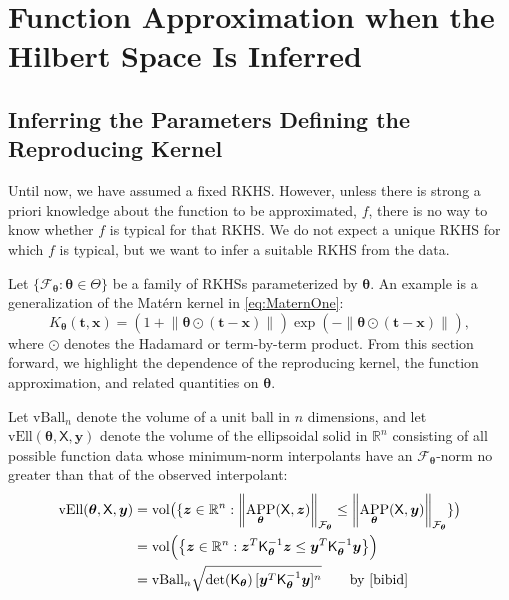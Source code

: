 \documentclass[]{mcom-l}
\theoremstyle{remark}
\newcommand{\vBall}{\text{vBall}_n}
\newcommand{\vEll}{\text{vEll}}
\DeclareMathOperator{\vol}{vol}
\DeclareMathOperator{\APP}{APP}
\newcommand{\reals}{{\mathbb{R}}}
\newcommand{\mK}{\mathsf{K}}
\newcommand{\mX}{\mathsf{X}}
\newcommand{\bx}{{\boldsymbol{x}}}
\newcommand{\by}{{\boldsymbol{y}}}
\newcommand{\bt}{{\boldsymbol{t}}}
\newcommand{\bz}{{\boldsymbol{z}}}
\newcommand{\btheta}{{\boldsymbol{\theta}}}
\newcommand{\calf}{{\mathcal{F}}}
\newcommand{\norm}[2][{}]{\ensuremath{\left \lVert #2 \right \rVert}_{#1}}
\begin{document}
\section{Function Approximation when the Hilbert Space Is Inferred} \label{sec:adaptF}



\subsection{Inferring the Parameters Defining the Reproducing Kernel} \label{sec:adaptTheta}

Until now, we have assumed a fixed RKHS.  However, unless there is strong a priori knowledge about the function to be approximated, $f$, there is no way to know whether $f$ is typical for  that RKHS.  We do not expect a unique RKHS for which $f$ is typical, but we want to infer a suitable RKHS from the data.  

Let $\{\calf_{\btheta} : \btheta \in \Theta\}$ be a family of RKHSs parameterized by $\btheta$.  An example is a generalization of the Mat\'ern kernel  in \eqref{eq:MaternOne}:
\begin{equation} \label{eq:MaternTheta}
K_\btheta(\bt,\bx) = (1 +  \norm{\btheta \odot (\bt-\bx)}) \exp(-\norm{\btheta \odot (\bt-\bx)}),
\end{equation}
where $\odot$ denotes the Hadamard or term-by-term product.  From this section forward, we highlight the dependence of the reproducing kernel, the function approximation, and related quantities on $\btheta$.

Let $\vBall$ denote the volume of a unit ball in $n$ dimensions, and let $\vEll(\btheta,\mX,\by)$ denote the volume of the ellipsoidal solid in $\reals^n$ consisting of all possible function data whose minimum-norm interpolants have an $\calf_{\btheta}$-norm no greater than that of the observed interpolant:
\begin{align*}
\vEll(\btheta,\mX,\by) &= \vol\bigl(\{ \bz \in \reals^n : \norm[\calf_{\btheta}]{\APP_{\btheta}(\mX,\bz)}  \le \norm[\calf_{\btheta}]{\APP_{\btheta}(\mX,\by)} \} \bigr) \\
& = \vol\Bigl( \bigl \{ \bz \in \reals^n : \bz^T \mK_\btheta^{-1} \bz \le \by^T \mK_\btheta^{-1} \by  \bigr \} \Bigr) \\
& = \vBall \sqrt{\det(\mK_{\btheta})  \, [\by^T \mK_\btheta^{-1} \by]^n } \qquad \text{by \cite{bibid}}
\end{align*}
\end{document}
